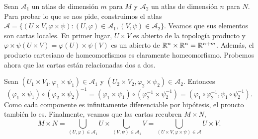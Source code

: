 \documentclass[twoside]{article}
\begin{document}
\begin{solucion}
Sean $\mathcal{A}_1$ un atlas de dimensión $m$ para $M$ y $\mathcal{A}_2$ un atlas de dimensión $n$ para $N$. Para probar lo que se nos pide, construimos el atlas $\mathcal{A}=\{(U\times V,\varphi\times\psi): (U,\varphi)\in\mathcal{A}_1, (V,\psi)\in\mathcal{A}_2\}$. Veamos que sus elementos son cartas locales. En primer lugar, $U\times V$ es abierto de la topología producto y $\varphi\times\psi(U\times V)=\varphi(U)\times\psi(V)$ es un abierto de $\mathbb{R}^n\times\mathbb{R}^n=\mathbb{R}^{n+m}$. Además, el producto cartesiano de homeomorfismos es claramente homeomorfismo. Probemos ahora que las cartas están relacionadas dos a dos. 

Sean $(U_1\times V_1,\varphi_1\times\psi_1)\in\mathcal{A}_1$ y $(U_2\times V_2,\varphi_2\times\psi_2)\in\mathcal{A}_2$. Entonces 
$$(\varphi_1\times\psi_1)\circ(\varphi_2\times\psi_2)^{-1}=(\varphi_1\times\psi_1)\circ(\varphi_2^{-1}\times\psi_2^{-1})=(\varphi_1\circ\varphi_2^{-1},\psi_1\circ\psi_2^{-1}).$$
Como cada componente es infinitamente diferenciable por hipótesis, el proucto también lo es. Finalmente, veamos que las cartas recubren $M\times N$,
$$M\times N= \bigcup_{(U,\varphi)\in\mathcal{A}_1}U\times\bigcup_{(V,\psi)\in\mathcal{A}_1}V=\bigcup_{(U\times V,\varphi\times\psi)\in\mathcal{A}}U\times V.$$
\end{solucion}
\end{document}
